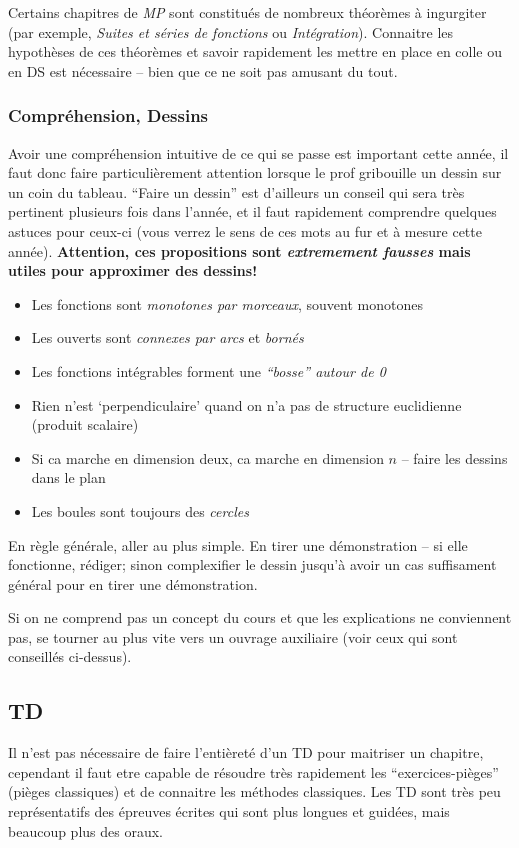 \documentclass{article}
\begin{document}
Certains chapitres de \textit{MP} sont constitués de nombreux théorèmes à ingurgiter (par exemple, \textit{Suites et séries de fonctions} ou \textit{Intégration}).
Connaitre les hypothèses de ces théorèmes et savoir rapidement les mettre en place en colle ou en DS est nécessaire -- bien que ce ne soit pas amusant du tout.

\subsubsection{Compréhension, Dessins}
Avoir une compréhension intuitive de ce qui se passe est important cette année, il faut donc faire particulièrement attention lorsque le prof gribouille un dessin sur un coin du tableau.
``Faire un dessin'' est d'ailleurs un conseil qui sera très pertinent plusieurs fois dans l'année, et il faut rapidement comprendre quelques astuces pour ceux-ci (vous verrez le sens de ces mots au fur et à mesure cette année).
\textbf{Attention, ces propositions sont \textit{extremement fausses} mais utiles pour approximer des dessins!}


\begin{itemize}
\item  Les fonctions sont \textit{monotones par morceaux}, souvent monotones
\item  Les ouverts sont \textit{connexes par arcs} et \textit{bornés}
\item  Les fonctions intégrables forment une \textit{``bosse'' autour de 0}
\item  Rien n'est `perpendiculaire' quand on n'a pas de structure euclidienne (produit scalaire)
\item  Si ca marche en dimension deux, ca marche en dimension $n$ -- faire les dessins dans le plan
\item  Les boules sont toujours des \textit{cercles}

\end{itemize}

En règle générale, aller au plus simple. En tirer une démonstration -- si elle fonctionne, rédiger; sinon complexifier le dessin jusqu'à avoir un cas suffisament général pour en tirer une démonstration.

Si on ne comprend pas un concept du cours et que les explications ne conviennent pas, se tourner au plus vite vers un ouvrage auxiliaire (voir ceux qui sont conseillés ci-dessus).

\subsection{TD}
Il n'est pas nécessaire de faire l'entièreté d'un TD pour maitriser un chapitre, cependant il faut etre capable de résoudre très rapidement les ``exercices-pièges'' (pièges classiques) et de connaitre les méthodes classiques.
Les TD sont très peu représentatifs des épreuves écrites qui sont plus longues et guidées, mais beaucoup plus des oraux.
\end{document}
